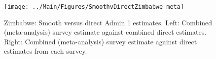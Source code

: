 \documentclass[12pt]{article}\usepackage[]{graphicx}\usepackage[]{color}
\newenvironment{knitrout}{}{} %
\begin{document}

\begin{knitrout}
\color{fgcolor}\begin{figure}[bht]

{\centering \texttt{[image: ../Main/Figures/SmoothvDirectZimbabwe\_meta]} 

}

\caption[Zimbabwe]{Zimbabwe: Smooth versus direct Admin 1 estimates. Left: Combined (meta-analysis) survey estimate against combined direct estimates. Right: Combined (meta-analysis) survey estimate against direct estimates from each survey.}\label{fig:unnamed-chunk-343}
\end{figure}


\end{knitrout}
\end{document}
